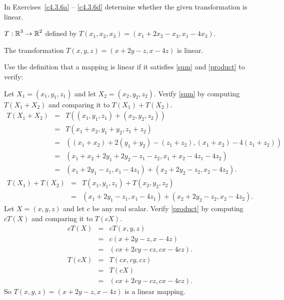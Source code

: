 \documentclass{ximera}
\begin{document}
\noindent In Exercises~\ref{c4.3.6a} -- \ref{c4.3.6d} determine
whether the given transformation is linear.
\begin{exercise} \label{c4.3.6a}
  $T:\mbox{$\Bbb{R}$}^3\to\mbox{$\Bbb{R}$}^2$ defined by $T(x_1,x_2,x_3)=(x_1+2x_2-x_3,x_1-4x_3)$.

\begin{solution}
\ans The transformation $T(x,y,z) = (x + 2y - z, x - 4z)$
is linear.

\soln Use the definition that a mapping is linear if it satisfies
\eqref{sum} and \eqref{product} to verify:

\para Let $X_1 = (x_1,y_1,z_1)$ and let $X_2 = (x_2,y_2,z_2)$.
Verify \eqref{sum} by computing $T(X_1 + X_2)$ and comparing it
to $T(X_1) + T(X_2)$.
\[ \begin{array}{rcl}
T(X_1 + X_2) & = & T((x_1,y_1,z_1) + (x_2, y_2, z_2)) \\
& = & T(x_1 + x_2, y_1 + y_2, z_1 + z_2) \\
& = & ((x_1 + x_2) + 2(y_1 + y_2) - (z_1 + z_2),
(x_1 + x_2) - 4(z_1 + z_2)) \\ & = &
(x_1 + x_2 + 2y_1 + 2y_2 - z_1 - z_2, x_1 + x_2 - 4z_1 - 4z_2) \\
& = & (x_1 + 2y_1 - z_1, x_1 - 4z_1) +
(x_2 + 2y_2 - z_2, x_2 - 4z_2). \end{array} \]
\[ 
\begin{array}{rcl}
T(X_1) + T(X_2)
& = & T(x_1,y_1,z_1) + T(x_2,y_2,z_2) \\
& = & (x_1 + 2y_1 - z_1, x_1 - 4z_1) +
(x_2 + 2y_2 - z_2, x_2 - 4z_2). \end{array} 
\]
Let $X = (x,y,z)$ and let $c$ be any real scalar.  Verify
\eqref{product} by computing $cT(X)$ and comparing it to $T(cX)$.
\[ 
\begin{array}{rcl}
cT(X) & = & cT(x,y,z) \\
& = & c(x + 2y - z, x - 4z) \\
& = & (cx + 2cy - cz, cx - 4cz). 
\end{array} 
\]
\[ 
\begin{array}{rcl}
T(cX) & = & T(cx,cy,cz) \\
& = & T(cX) \\
& = & (cx + 2cy - cz, cx - 4cz). \end{array} 
\]
So $T(x,y,z) = (x + 2y - z, x - 4z)$ is a linear mapping.

\end{solution}
\end{exercise}
\end{document}
